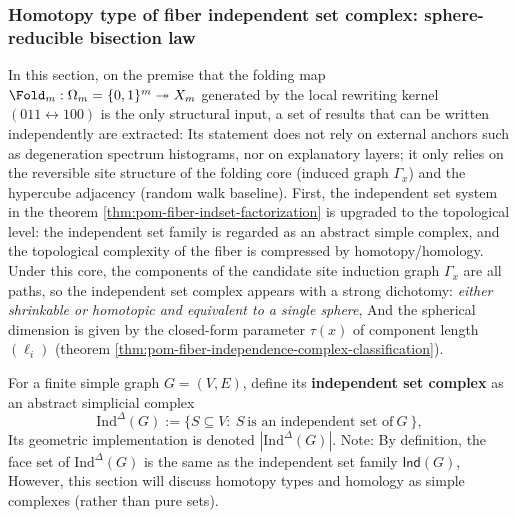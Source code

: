 %

\subsubsection{Homotopy type of fiber independent set complex: sphere-reducible bisection law}\label{subsubsec:pom-fiber-indcomplex}

In this section, on the premise that the folding map \(\Fold_m:\Omega_m=\{0,1\}^m\twoheadrightarrow X_m\) generated by the local rewriting kernel \((011\leftrightarrow 100)\) is the only structural input, a set of results that can be written independently are extracted:
Its statement does not rely on external anchors such as degeneration spectrum histograms, nor on explanatory layers; it only relies on the reversible site structure of the folding core (induced graph \(\Gamma_x\)) and the hypercube adjacency (random walk baseline).
First, the independent set system in the theorem \ref{thm:pom-fiber-indset-factorization} is upgraded to the topological level: the independent set family is regarded as an abstract simple complex, and the topological complexity of the fiber is compressed by homotopy/homology.
Under this core, the components of the candidate site induction graph \(\Gamma_x\) are all paths, so the independent set complex appears with a strong dichotomy: \emph{either shrinkable or homotopic and equivalent to a single sphere},
And the spherical dimension is given by the closed-form parameter \(\tau(x)\) of component length \((\ell_i)\) (theorem \ref{thm:pom-fiber-independence-complex-classification}).

\begin{definition}\label{def:pom-independence-complex}
For a finite simple graph \(G=(V,E)\), define its \textbf{independent set complex} as an abstract simplicial complex
\[
\mathrm{Ind}^{\Delta}(G):=\{S\subseteq V:\ S\ \text{is an independent set of}\ G\ \text{}\},
\]
Its geometric implementation is denoted \(|\mathrm{Ind}^{\Delta}(G)|\).
Note: By definition, the face set of \(\mathrm{Ind}^{\Delta}(G)\) is the same as the independent set family \(\mathsf{Ind}(G)\),
However, this section will discuss homotopy types and homology as simple complexes (rather than pure sets).
\end{definition}

